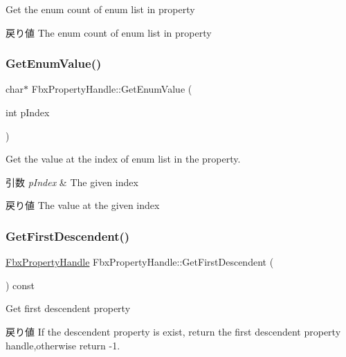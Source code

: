 Get the enum count of enum list in property \begin{DoxyReturn}{戻り値}
The enum count of enum list in property 
\end{DoxyReturn}
\mbox{\label{class_fbx_property_handle_a0c80a68745b75cb46ca742603506f75b}} 
\subsubsection{\texorpdfstring{Get\+Enum\+Value()}{GetEnumValue()}}
{\footnotesize\ttfamily char$\ast$ Fbx\+Property\+Handle\+::\+Get\+Enum\+Value (\begin{DoxyParamCaption}\item[{int}]{p\+Index }\end{DoxyParamCaption})}

Get the value at the index of enum list in the property. 
\begin{DoxyParams}{引数}
{\em p\+Index} & The given index \\
\hline
\end{DoxyParams}
\begin{DoxyReturn}{戻り値}
The value at the given index 
\end{DoxyReturn}
\mbox{\label{class_fbx_property_handle_a89892765ba818c194c4615bb84ea0c8c}} 
\subsubsection{\texorpdfstring{Get\+First\+Descendent()}{GetFirstDescendent()}}
{\footnotesize\ttfamily \hyperlink{class_fbx_property_handle}{Fbx\+Property\+Handle} Fbx\+Property\+Handle\+::\+Get\+First\+Descendent (\begin{DoxyParamCaption}{ }\end{DoxyParamCaption}) const}

Get first descendent property \begin{DoxyReturn}{戻り値}
If the descendent property is exist, return the first descendent property handle,otherwise return -\/1. 
\end{DoxyReturn}
\mbox{\label{class_fbx_property_handle_a3283a9c3b0cca5cdb058751a90d794c2}} 
